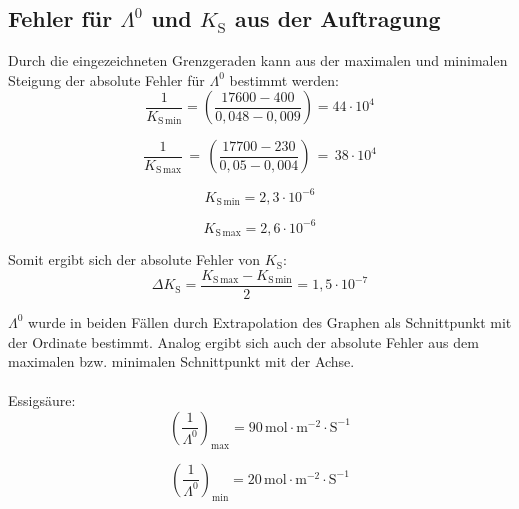 \documentclass[12pt,a4paper,titlepage,headinclude,bibtotoc]{scrartcl}
\begin{document}
\newpage

\subsection{Fehler für $\mathit{\Lambda^0}$ und $K_{\mathrm{S}}$ aus der Auftragung}

Durch die eingezeichneten Grenzgeraden kann aus der maximalen und minimalen Steigung der absolute Fehler für $\mathit{\Lambda^0}$ bestimmt werden:\\


\begin{equation}
\frac{1}{K_{\mathrm{S}\,\mathrm{min}}} =\left( \frac{17600-400}{0,048-0,009} \right)= 44\cdot 10^4
\end{equation}

\begin{equation}
\frac{1}{K_{\mathrm{S}\,\mathrm{max}}}\,=\,\left(\frac{17700-230}{0,05-0,004}\right)\,=\, 38 \cdot 10^4
\end{equation}


\begin{equation}
K_{\mathrm{S}\,\mathrm{min}} = 2,3 \cdot 10^{-6}
\end{equation}

\begin{equation}
K_{\mathrm{S}\,\mathrm{max}} = 2,6 \cdot 10^{-6}
\end{equation}


Somit ergibt sich der absolute Fehler von $K_{\mathrm{S}}$:\\

\begin{equation}
\Delta K_{\mathrm{S}} = \frac{K_{\mathrm{S}\,\mathrm{max}} - K_{\mathrm{S}\,\mathrm{min}}}{2} = 1,5 \cdot 10^{-7}
\end{equation}


$\mathit{\Lambda^0}$ wurde in beiden Fällen durch Extrapolation des Graphen als Schnittpunkt mit der Ordinate bestimmt. Analog ergibt sich auch der absolute Fehler aus dem maximalen bzw. minimalen Schnittpunkt mit der Achse. \\
\\
Essigsäure:\\

\begin{equation}
\left(\frac{1}{\mathit{\Lambda^0}}\right)_\mathrm{max} = 90\, \mathrm{mol \cdot m^{-2} \cdot S^{-1}}
\end{equation}

\begin{equation}
\left(\frac{1}{\mathit{\Lambda^0}}\right)_\mathrm{min} = 20\, \mathrm{mol \cdot m^{-2} \cdot S^{-1}}
\end{equation}
\end{document}

